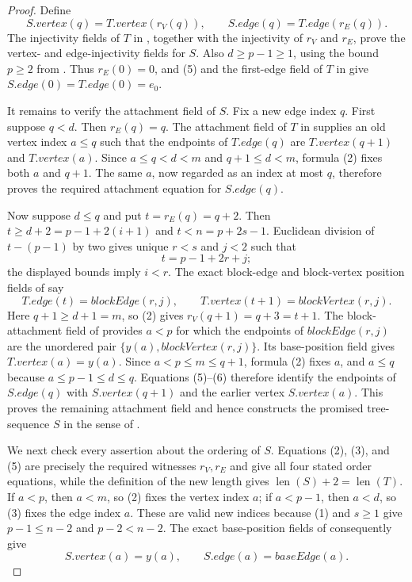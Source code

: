 \begin{proof}
Define
\[
 S.\mathit{vertex}(q)=T.\mathit{vertex}(r_V(q)),
 \qquad
 S.\mathit{edge}(q)=T.\mathit{edge}(r_E(q)).
\tag{5}
\]
The injectivity fields of $T$ in , together with
the injectivity of $r_V$ and $r_E$, prove the vertex- and edge-injectivity
fields for $S$.  Also $d\geq p-1\geq1$, using the bound $p\geq2$ from
.  Thus $r_E(0)=0$, and (5) and
the first-edge field of $T$ in  give
$S.\mathit{edge}(0)=T.\mathit{edge}(0)=e_0$.

It remains to verify the attachment field of $S$.  Fix a new edge index
$q$.  First suppose $q<d$.  Then $r_E(q)=q$.  The attachment field of
$T$ in  supplies an old vertex index $a\leq q$
such that the endpoints of $T.\mathit{edge}(q)$ are
$T.\mathit{vertex}(q+1)$ and $T.\mathit{vertex}(a)$.  Since
$a\leq q<d<m$ and $q+1\leq d<m$, formula (2) fixes both $a$ and $q+1$.
The same $a$, now regarded as an index at most $q$, therefore proves the
required attachment equation for $S.\mathit{edge}(q)$.

Now suppose $d\leq q$ and put $t=r_E(q)=q+2$.  Then
$t\geq d+2=p-1+2(i+1)$ and $t<n=p+2s-1$.  Euclidean division of
$t-(p-1)$ by two gives unique $r<s$ and $j<2$ such that
\[
 t=p-1+2r+j;
\]
the displayed bounds imply $i<r$.  The exact block-edge and block-vertex
position fields of  say
\[
 T.\mathit{edge}(t)=\mathit{blockEdge}(r,j),
 \qquad
 T.\mathit{vertex}(t+1)=\mathit{blockVertex}(r,j).
\tag{6}
\]
Here $q+1\geq d+1=m$, so (2) gives $r_V(q+1)=q+3=t+1$.
The block-attachment field of 
provides $a<p$ for which the endpoints of
$\mathit{blockEdge}(r,j)$ are the unordered pair
$\{y(a),\mathit{blockVertex}(r,j)\}$.  Its base-position field gives
$T.\mathit{vertex}(a)=y(a)$.  Since
$a<p\leq m\leq q+1$, formula (2) fixes $a$, and $a\leq q$ because
$a\leq p-1\leq d\leq q$.  Equations (5)--(6) therefore identify the
endpoints of $S.\mathit{edge}(q)$ with
$S.\mathit{vertex}(q+1)$ and the earlier vertex
$S.\mathit{vertex}(a)$.  This proves the remaining attachment field and
hence constructs the promised tree-sequence $S$ in the sense of
.

We next check every assertion about the ordering of $S$.  Equations
(2), (3), and (5) are precisely the required witnesses $r_V,r_E$ and
give all four stated order equations, while the definition of the new
length gives $\operatorname{len}(S)+2=\operatorname{len}(T)$.  If $a<p$,
then $a<m$, so (2) fixes the vertex index $a$; if $a<p-1$, then $a<d$,
so (3) fixes the edge index $a$.  These are valid new indices because
(1) and $s\geq1$ give $p-1\leq n-2$ and $p-2<n-2$.  The exact
base-position fields of
 consequently give
\[
 S.\mathit{vertex}(a)=y(a),
 \qquad
 S.\mathit{edge}(a)=\mathit{baseEdge}(a).
\tag{7}
\]


\end{proof}
